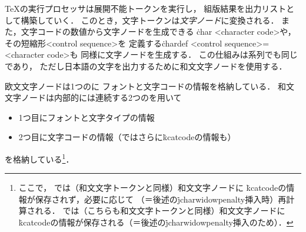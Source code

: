 \documentclass[a4paper,11pt,nomag,dvipdfmx]{jsarticle}
\begin{document}
\TeX の実行プロセッサは展開不能トークンを実行し，
組版結果を出力リストとして構築していく．
このとき，文字トークンは\emph{文字ノード}に変換される．
また，文字コードの数値から文字ノードを生成できる
\.{char} <character code>や，その短縮形<control sequence>を
定義する\.{chardef} <control sequence>=<character code>も
同様に文字ノードを生成する．
この仕組みは\pTeX 系列でも同じであり，
ただし日本語の文字を出力するために和文文字ノードを使用する．

欧文文字ノードは1つのに
フォントと文字コードの情報を格納している．
和文文字ノードは内部的には連続する2つのを用いて
\begin{itemize}
 \item 1つ目にフォントと文字タイプの情報
 \item 2つ目に文字コードの情報（\upTeX ではさらに\.{kcatcode}の情報も）
\end{itemize}
を格納している\footnote{ここで，
\pTeX では（和文文字トークンと同様）和文文字ノードに
\.{kcatcode}の情報が保存されず，必要に応じて
（＝後述の\.{jcharwidowpenalty}挿入時）再計算される．
\upTeX では（こちらも和文文字トークンと同様）和文文字ノードに
\.{kcatcode}の情報が保存される（＝後述の\.{jcharwidowpenalty}挿入のため）．}．
\end{document}
